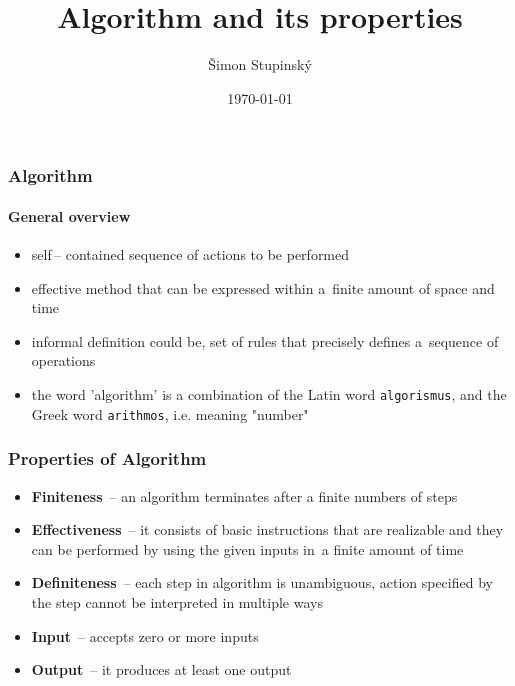 \documentclass{beamer}
\title{Algorithm and its properties}
\author{\texorpdfstring{Šimon Stupinský}{AUTHOR}}
\date{\today}
\begin{document}
\begin{frame}
  \titlepage
\end{frame}

\begin{frame}
  \frametitle{Algorithm}
  \framesubtitle{General overview}
  \begin{itemize}
    \item{self\,-- contained sequence of actions to be performed}
    \item{effective method that can be expressed within a~finite amount of space and time}
    \item{informal definition could be, set of rules that precisely defines a~sequence of operations}
    \item{the word 'algorithm' is a combination of the Latin word \texttt{algorismus}, and the Greek word \texttt{arithmos}, i.e. meaning "number"}
    \nocite{wiki}
  \end{itemize}
\end{frame}

\begin{frame}
  \frametitle{Properties of Algorithm}
  \begin{itemize}
    \item<1->{\textbf{\large{Finiteness}} \,-- an algorithm terminates after a finite numbers of steps}
    \item<2->{\textbf{\large{Effectiveness}} \,-- it consists of basic instructions that are realizable and they can be performed by using the given inputs in~a finite amount of time}
    \item<3->{\textbf{\large{Definiteness}} \,-- each step in algorithm is unambiguous, action specified by the step cannot be interpreted in multiple ways}
    \item<4->{\textbf{\large{Input}} \,-- accepts zero or more inputs}
    \item<5->{\textbf{\large{Output}} \,-- it produces at least one output}
  \end{itemize}
\end{frame}
\end{document}
